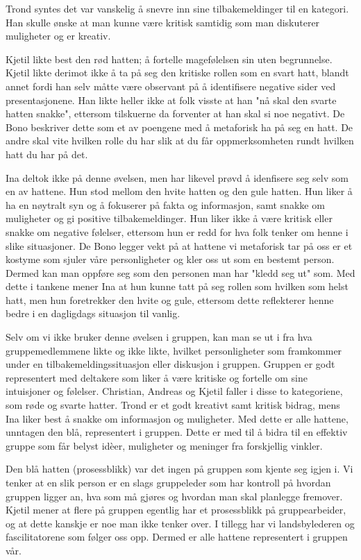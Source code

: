 Trond syntes det var vanskelig å snevre inn sine tilbakemeldinger til en kategori. Han skulle ønske at man kunne være kritisk samtidig som man diskuterer muligheter og er kreativ. 

Kjetil likte best den rød hatten; å fortelle magefølelsen sin uten begrunnelse. Kjetil likte derimot ikke å ta på seg den kritiske rollen som en svart hatt, blandt annet fordi han selv måtte være observant på å identifisere negative sider ved presentasjonene. Han likte heller ikke at folk visste at han "nå skal den svarte hatten snakke", ettersom tilskuerne da forventer at han skal si noe negativt. De Bono beskriver dette som et av poengene med å metaforisk ha på seg en hatt. De andre skal vite hvilken rolle du har slik at du får oppmerksomheten rundt hvilken hatt du har på det. 

Ina deltok ikke på denne øvelsen, men har likevel prøvd å idenfisere seg selv som en av hattene. Hun stod mellom den hvite hatten og den gule hatten. Hun liker å ha en nøytralt syn og å fokuserer på fakta og informasjon, samt snakke om muligheter og gi positive tilbakemeldinger. Hun liker ikke å være kritisk eller snakke om negative følelser, ettersom hun er redd for hva folk tenker om henne i slike situasjoner. De Bono legger vekt på at hattene vi metaforisk tar på oss er et kostyme som sjuler våre personligheter og kler oss ut som en bestemt person. Dermed kan man oppføre seg som den personen man har "kledd seg ut" som. Med dette i tankene mener Ina at hun kunne tatt på seg rollen som hvilken som helst hatt, men hun foretrekker den hvite og gule, ettersom dette reflekterer henne bedre i en dagligdags situasjon til vanlig.

Selv om vi ikke bruker denne øvelsen i gruppen, kan man se ut i fra hva gruppemedlemmene likte og ikke likte, hvilket personligheter som framkommer under en tilbakemeldingssituasjon eller diskusjon i gruppen. Gruppen er godt representert med deltakere som liker å være kritiske og fortelle om sine intuisjoner og følelser. Christian, Andreas og Kjetil faller i disse to kategoriene, som røde og svarte hatter. Trond er et godt kreativt samt kritisk bidrag, mens Ina liker best å snakke om informasjon og muligheter. Med dette er alle hattene, unntagen den blå, representert i gruppen. Dette er med til å bidra til en effektiv gruppe som får belyst idèer, muligheter og meninger fra forskjellig vinkler. 

Den blå hatten (prosessblikk) var det ingen på gruppen som kjente seg igjen i. Vi tenker at en slik person er en slags gruppeleder som har kontroll på hvordan gruppen ligger an, hva som må gjøres og hvordan man skal planlegge fremover. Kjetil mener at flere på gruppen egentlig har et prosessblikk på gruppearbeider, og at dette kanskje er noe man ikke tenker over. I tillegg har vi landsbylederen og fascilitatorene som følger oss opp. Dermed er alle hattene representert i gruppen vår.

